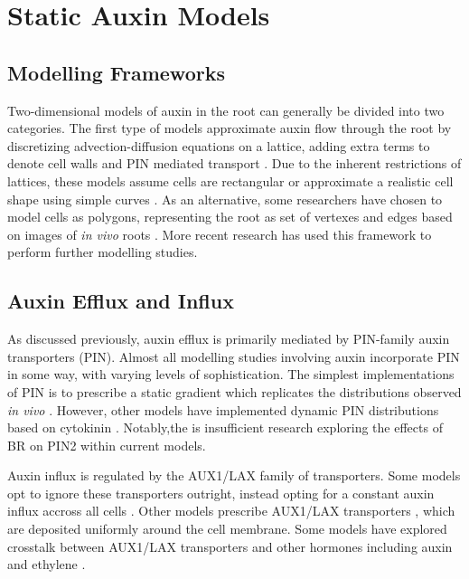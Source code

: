 \section{Static Auxin Models}

\subsection{Modelling Frameworks}

Two-dimensional models of auxin in the root can generally be divided into two categories. The first type of models approximate auxin flow through the root by discretizing advection-diffusion equations on a lattice, adding extra terms to denote cell walls and PIN mediated transport \cite{grieneisen2007, muraro2013, moore2015, dimambro2017, salvi2020}. Due to the inherent restrictions of lattices, these models assume cells are rectangular \cite{grieneisen2007, muraro2013, moore2015} or approximate a realistic cell shape using simple curves \cite{dimambro2017, salvi2020}. As an alternative, some researchers have chosen to model cells as polygons, representing the root as set of vertexes and edges based on images of \emph{in vivo} roots \cite{band2014}. More recent research \cite{mellor2016, mellor2020} has used this framework to perform further modelling studies.

\subsection{Auxin Efflux and Influx}

As discussed previously, auxin efflux is primarily mediated by PIN-family auxin transporters (PIN). Almost all modelling studies involving auxin incorporate PIN in some way, with varying levels of sophistication. The simplest implementations of PIN is to prescribe a static gradient which replicates the distributions observed \emph{in vivo} \cite{grieneisen2007, band2014, mellor2016, mellor2020}. However, other models have implemented dynamic PIN distributions based on cytokinin \cite{dimambro2017, moore2015, muraro2013, salvi2020}. Notably,the is insufficient research exploring the effects of BR on PIN2 \cite{ambrose2013} within current models.

\medskip

Auxin influx is regulated by the AUX1/LAX family of transporters. Some models opt to ignore these transporters outright, instead opting for a constant auxin influx accross all cells \cite{grieneisen2007}. Other models prescribe AUX1/LAX transporters \cite{band2014, mellor2016, mellor2020}, which are deposited uniformly around the cell membrane. Some models have explored crosstalk between AUX1/LAX transporters and other hormones including auxin \cite{salvi2020} and ethylene \cite{moore2015}.

